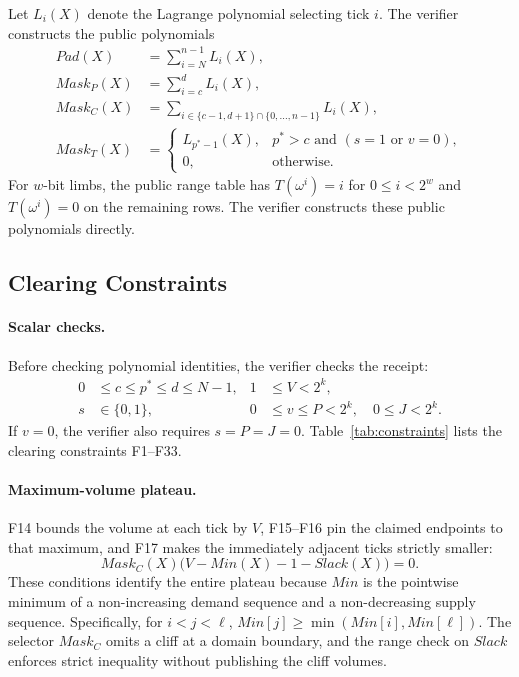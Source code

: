 Let \(L_i(X)\) denote the Lagrange polynomial selecting tick \(i\). The verifier constructs the public polynomials
\[
\begin{aligned}
Pad(X)&=\sum_{i=N}^{n-1}L_i(X),\\
Mask_P(X)&=\sum_{i=c}^{d}L_i(X),\\
Mask_C(X)&=\sum_{i\in\{c-1,d+1\}\cap\{0,\ldots,n-1\}}L_i(X),\\
Mask_T(X)&=\begin{cases}
L_{p^*-1}(X),&p^*>c\text{ and }(s=1\text{ or }v=0),\\
0,&\text{otherwise.}
\end{cases}
\end{aligned}
\]
For \(w\)-bit limbs, the public range table has \(T(\omega^i)=i\) for \(0\le i<2^w\) and \(T(\omega^i)=0\) on the remaining rows. The verifier constructs these public polynomials directly.

\subsection{Clearing Constraints}

\paragraph{Scalar checks.} Before checking polynomial identities, the verifier checks the receipt:
\[
\begin{aligned}
0&\le c\le p^*\le d\le N-1, & 1&\le V<2^k,\\
s&\in\{0,1\}, & 0&\le v\le P<2^k,\quad 0\le J<2^k.
\end{aligned}
\]
If \(v=0\), the verifier also requires \(s=P=J=0\). Table~\ref{tab:constraints} lists the clearing constraints F1--F33.

\paragraph{Maximum-volume plateau.} F14 bounds the volume at each tick by \(V\), F15--F16 pin the claimed endpoints to that maximum, and F17 makes the immediately adjacent ticks strictly smaller:
\[
Mask_C(X)\bigl(V-Min(X)-1-Slack(X)\bigr)=0.\tag{F17}
\]
These conditions identify the entire plateau because \(Min\) is the pointwise minimum of a non-increasing demand sequence and a non-decreasing supply sequence. Specifically, for \(i<j<\ell\), \(Min[j]\ge\min(Min[i],Min[\ell])\). The selector \(Mask_C\) omits a cliff at a domain boundary, and the range check on \(Slack\) enforces strict inequality without publishing the cliff volumes.

